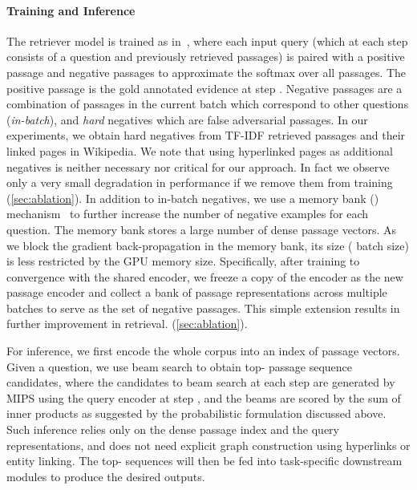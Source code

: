 \documentclass{article} \usepackage{iclr2021_conference,times}
\begin{document}
\paragraph{Training and Inference} The retriever model is trained as in~\citet{DPR}, where each input query (which at each step consists of a question and previously retrieved passages) is paired with a positive passage and  negative passages to approximate the softmax over all passages.  The positive passage is the gold annotated evidence at step .  Negative passages are a combination of passages in the current batch which correspond to other questions (\emph{in-batch}), and \emph{hard} negatives which are false adversarial passages.  In our experiments, we obtain hard negatives from TF-IDF retrieved passages and their linked pages in Wikipedia.  We note that using hyperlinked pages as additional negatives is neither necessary nor critical for our approach.  In fact we observe only a very small degradation in performance if we remove them from training (\cref{sec:ablation}). In addition to in-batch negatives, we use a memory bank () mechanism~\citep{MemoryBank} to further increase the number of negative examples for each question. The memory bank stores a large number of dense passage vectors. As we block the gradient back-propagation in the memory bank, its size ( batch size) is less restricted by the GPU memory size. Specifically, after training to convergence with the shared encoder, we freeze a copy of the encoder as the new passage encoder and collect a bank of passage representations across multiple batches to serve as the set of negative passages. This simple extension results in further improvement in retrieval. (\cref{sec:ablation}).







For inference, we first encode the whole corpus into an index of passage vectors. Given a question, we use beam search to obtain top- passage sequence candidates, where the candidates to beam search at each step are generated by MIPS using the query encoder at step , and 
the beams are scored by the sum of inner products
as suggested by the probabilistic formulation discussed above.  Such inference relies only on the dense passage index and the query representations, and does not need explicit graph construction using hyperlinks or entity linking. The top- sequences will then be fed into task-specific downstream modules to produce the desired outputs. 
\end{document}
